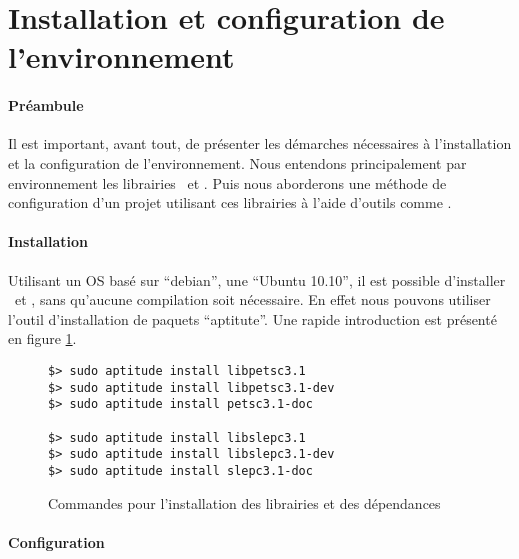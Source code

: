 %

\section{Installation et configuration de l'environnement}

\paragraph{Préambule}

Il est important, avant tout, de présenter les démarches nécessaires à l'installation et la configuration de l'environnement. Nous entendons principalement par environnement les librairies \petsc\ et \slepc. Puis nous aborderons une méthode de configuration d'un projet utilisant ces librairies à l'aide d'outils comme \cmake.

\paragraph{Installation}

Utilisant un OS basé sur ``debian'', une ``Ubuntu 10.10'', il est possible d'installer \petsc\ et \slepc, sans qu'aucune compilation soit nécessaire. En effet nous pouvons utiliser l'outil d'installation de paquets ``aptitute''. Une rapide introduction est présenté en figure \ref{fig:installation}.

\begin{figure}[here]
\begin{verbatim}
$> sudo aptitude install libpetsc3.1
$> sudo aptitude install libpetsc3.1-dev
$> sudo aptitude install petsc3.1-doc

$> sudo aptitude install libslepc3.1
$> sudo aptitude install libslepc3.1-dev
$> sudo aptitude install slepc3.1-doc
\end{verbatim}
  \caption{Commandes pour l'installation des librairies et des dépendances}
  \label{fig:installation}
\end{figure}

\paragraph{Configuration}

